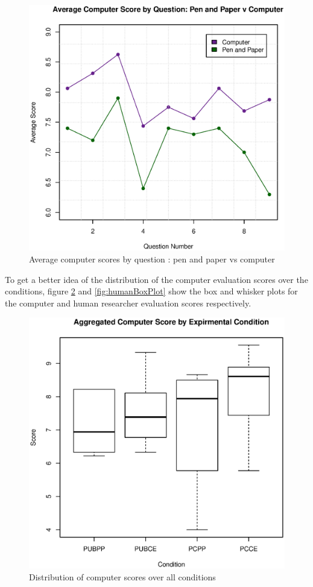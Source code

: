 \documentclass{sig-alternate-05-2015}
\begin{document}
\begin{figure}[h]
\includegraphics[width=\columnwidth]{ScorebyQuestion_ppVcomp}
\centering
\caption{Average computer scores by question : pen and paper vs computer}
\label{fig:ppvcomp}
\end{figure}

To get a better idea of the distribution of the computer evaluation scores over the conditions, figure \ref{fig:compBoxPlot} and \ref{fig:humanBoxPlot} show the box and whisker plots for the computer and human researcher evaluation scores respectively.

\begin{figure}[h]
\includegraphics[width=\columnwidth]{compBoxPlot}
\centering
\caption{Distribution of computer scores over all conditions}
\label{fig:compBoxPlot}
\end{figure}
\end{document}

